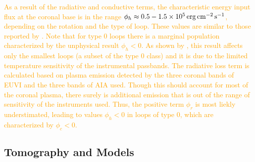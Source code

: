 \documentclass[namedreferences]{solarphysics}
\newcommand{\cm}{{\rm cm}}
\newcommand{\cminvs}{\cm^{-2}}
\newcommand{\erg}{{\rm erg}}
\newcommand{\s}{{\rm s}}
\def\albert#1{\textcolor{orange}{#1}}
\begin{document}
\begin{article}
\albert{As a result of the radiative and conductive terms, the characteristic energy input flux at the coronal base is in the range $\phi_h\approx 0.5-1.5 \times 10^5\,\erg\,\cminvs\,\s^{-1}$, depending on the rotation and the type of loop. These values are similar to those reported by \citet{maccormack_2017}. Note that for type 0 loops there is a marginal population characterized by the unphysical result $\phi_h<0$. As shown by \citet{maccormack_2017}, this result affects only the smallest loops (a subset of the type 0 class) and it is due to the limited temperature sensitivity of the instrumental passbands. The radiative loss term is calculated based on plasma emission detected by the three coronal bands of EUVI and the three bands of AIA used. Though this should account for most of the coronal plasma, there surely is additional emission that is out of the range of sensitivity of the instruments used. Thus, the positive term $\phi_r$ is most liekly understimated, leading to values $\phi_h<0$ in loops of type 0, which are characterized by $\phi_c<0$.}




\subsection{Tomography and Models}\label{awsom_res} 


\end{article}
\end{document}
